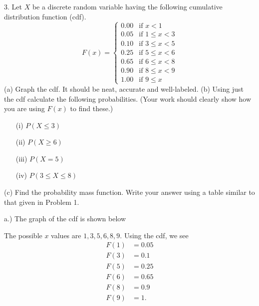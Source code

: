 \documentclass{report}
\begin{document}
 \pagebreak \bigbreak \noindent 
 \begin{mdframed}
     3. Let $X$ be a discrete random variable having the following cumulative distribution function (cdf).
     \[
         F(x) = \begin{cases} 
             0.00 & \text{if } x < 1 \\
             0.05 & \text{if } 1 \leq x < 3 \\
             0.10 & \text{if } 3 \leq x < 5 \\
             0.25 & \text{if } 5 \leq x < 6 \\
             0.65 & \text{if } 6 \leq x < 8 \\
             0.90 & \text{if } 8 \leq x < 9 \\
             1.00 & \text{if } 9 \leq x 
         \end{cases}
     \]
     \bigbreak \noindent 
     (a) Graph the cdf. It should be neat, accurate and well-labeled.
     \bigbreak \noindent 
     (b) Using just the cdf calculate the following probabilities. (Your work should clearly show how you are using $F(x)$ to find these.)
     \begin{itemize}
         \item[(i)] $P(X \leq 3)$
         \item[(ii)] $P(X \geq 6)$
         \item[(iii)] $P(X = 5)$
         \item[(iv)] $P(3 \leq X \leq 8)$
     \end{itemize}
     \bigbreak \noindent 
     (c) Find the probability mass function. Write your answer using a table similar to that given in Problem 1.
 \end{mdframed}
 \bigbreak \noindent 
 a.) The graph of the cdf is shown below
 \bigbreak \noindent 
    \begin{figure}[ht]
        \centering
        \label{fig:cdf2}
    \end{figure}
    \bigbreak \noindent 
    The possible $x$ values are $1,3,5,6,8,9$. Using the cdf, we see
    \begin{align*}
        F(1) &= 0.05 \\
        F(3) &= 0.1 \\
        F(5) &= 0.25 \\
        F(6) &= 0.65 \\
        F(8) &= 0.9 \\
        F(9) &= 1 
    .\end{align*}
\end{document}
